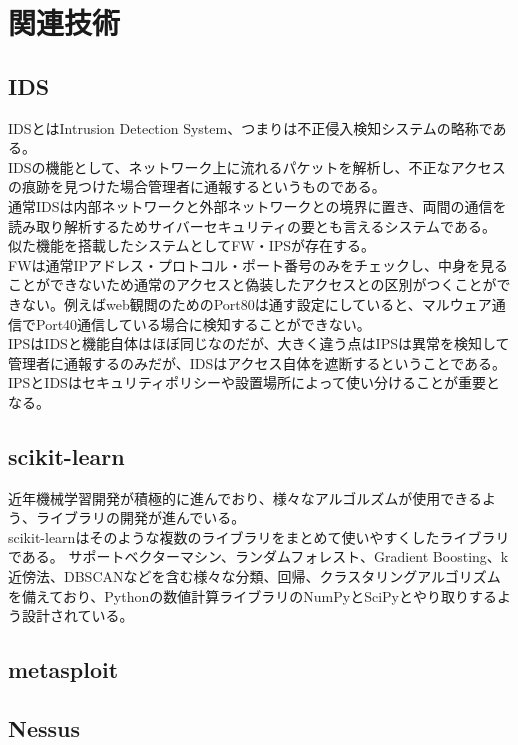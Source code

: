 \chapter{関連技術}
\section{IDS}
IDSとはIntrusion Detection System、つまりは不正侵入検知システムの略称である。\\
IDSの機能として、ネットワーク上に流れるパケットを解析し、不正なアクセスの痕跡を見つけた場合管理者に通報するというものである。\\
通常IDSは内部ネットワークと外部ネットワークとの境界に置き、両間の通信を読み取り解析するためサイバーセキュリティの要とも言えるシステムである。\\
似た機能を搭載したシステムとしてFW・IPSが存在する。\\
FWは通常IPアドレス・プロトコル・ポート番号のみをチェックし、中身を見ることができないため通常のアクセスと偽装したアクセスとの区別がつくことができない。例えばweb観閲のためのPort80は通す設定にしていると、マルウェア通信でPort40通信している場合に検知することができない。\\
IPSはIDSと機能自体はほぼ同じなのだが、大きく違う点はIPSは異常を検知して管理者に通報するのみだが、IDSはアクセス自体を遮断するということである。IPSとIDSはセキュリティポリシーや設置場所によって使い分けることが重要となる。\\


\section{scikit-learn}
近年機械学習開発が積極的に進んでおり、様々なアルゴルズムが使用できるよう、ライブラリの開発が進んでいる。\\
scikit-learnはそのような複数のライブラリをまとめて使いやすくしたライブラリである。
サポートベクターマシン、ランダムフォレスト、Gradient Boosting、k近傍法、DBSCANなどを含む様々な分類、回帰、クラスタリングアルゴリズムを備えており、Pythonの数値計算ライブラリのNumPyとSciPyとやり取りするよう設計されている。

\section{metasploit}

\section{Nessus}
